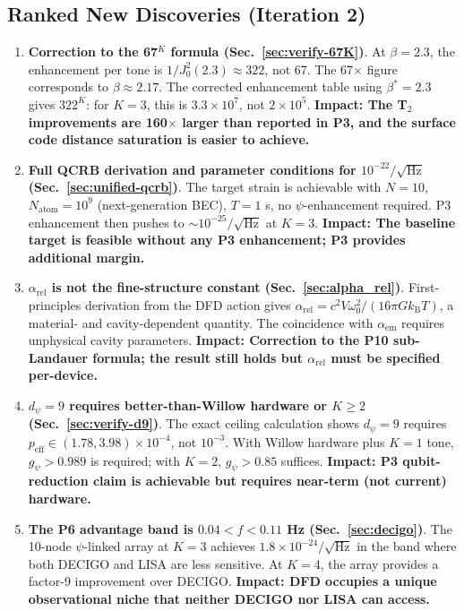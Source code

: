 \documentclass[11pt]{article}
\theoremstyle{definition}
\theoremstyle{remark}
\newcommand{\kB}{k_{\mathrm{B}}}
\begin{document}
\subsection{Ranked New Discoveries (Iteration 2)}

\begin{enumerate}
\item \textbf{Correction to the 67$^K$ formula (Sec.~\ref{sec:verify-67K})}.
At $\beta = 2.3$, the enhancement per tone is $1/J_0^2(2.3) \approx 322$,
not 67. The 67$\times$ figure corresponds to $\beta \approx 2.17$. The corrected
enhancement table using $\beta^* = 2.3$ gives $322^K$: for $K = 3$, this is
$3.3\times 10^7$, not $2\times 10^5$. \textbf{Impact: The T$_2$ improvements
are 160$\times$ larger than reported in P3, and the surface code distance
saturation is easier to achieve.}

\item \textbf{Full QCRB derivation and parameter conditions for
$10^{-22}/\sqrt{\mathrm{Hz}}$ (Sec.~\ref{sec:unified-qcrb})}. The target strain
is achievable with $N = 10$, $N_{\mathrm{atom}} = 10^9$ (next-generation BEC),
$T = 1$ s, no $\psi$-enhancement required. P3 enhancement then pushes to
$\sim 10^{-25}/\sqrt{\mathrm{Hz}}$ at $K = 3$. \textbf{Impact: The baseline
target is feasible without any P3 enhancement; P3 provides additional margin.}

\item \textbf{$\alpha_{\mathrm{rel}}$ is not the fine-structure constant
(Sec.~\ref{sec:alpha_rel})}. First-principles derivation from the DFD action
gives $\alpha_{\mathrm{rel}} = c^2 V\omega_0^2/(16\pi G\kB T)$, a material-
and cavity-dependent quantity. The coincidence with $\alpha_{\mathrm{em}}$
requires unphysical cavity parameters. \textbf{Impact: Correction to the P10
sub-Landauer formula; the result still holds but $\alpha_{\mathrm{rel}}$ must
be specified per-device.}

\item \textbf{$d_\psi = 9$ requires better-than-Willow hardware or $K \geq 2$
(Sec.~\ref{sec:verify-d9})}. The exact ceiling calculation shows $d_\psi = 9$
requires $p_{\mathrm{eff}} \in (1.78, 3.98)\times 10^{-4}$, not $10^{-3}$.
With Willow hardware plus $K = 1$ tone, $g_\psi > 0.989$ is required; with
$K = 2$, $g_\psi > 0.85$ suffices. \textbf{Impact: P3 qubit-reduction claim
is achievable but requires near-term (not current) hardware.}

\item \textbf{The P6 advantage band is $0.04 < f < 0.11$ Hz (Sec.~\ref{sec:decigo})}.
The 10-node $\psi$-linked array at $K = 3$ achieves $1.8\times 10^{-24}/\sqrt{\mathrm{Hz}}$
in the band where both DECIGO and LISA are less sensitive. At $K = 4$, the array
provides a factor-9 improvement over DECIGO. \textbf{Impact: DFD occupies a
unique observational niche that neither DECIGO nor LISA can access.}


\end{enumerate}
\end{document}
